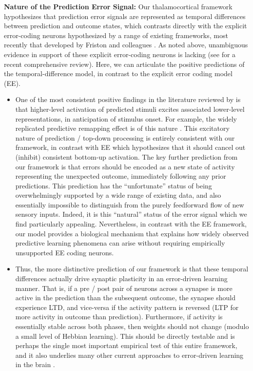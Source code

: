 \documentclass[11pt,twoside]{article}
\newif\myifpdf
\begin{document}
{\bf Nature of the Prediction Error Signal:} Our thalamocortical framework hypothesizes that prediction error signals are represented as temporal differences between prediction and outcome states, which contrasts directly with the explicit error-coding neurons hypothesized by a range of existing frameworks, most recently that developed by Friston and colleagues \cite{Friston10}.  As noted above, unambiguous evidence in support of these explicit error-coding neurons is lacking (see  for a recent comprehensive review).  Here, we can articulate the positive predictions of the temporal-difference model, in contrast to the explicit error coding model (EE).
\begin{itemize}
	\item One of the most consistent positive findings in the literature reviewed by  is that higher-level activation of predicted stimuli excites associated lower-level representations, in anticipation of stimulus onset.  For example, the widely replicated predictive remapping effect is of this nature \cite{DuhamelColbyGoldberg92,CavanaghHuntAfrazEtAl10}.  This excitatory nature of prediction / top-down processing is entirely consistent with our framework, in contrast with EE which hypothesizes that it should cancel out (inhibit) consistent bottom-up activation.  The key further prediction from our framework is that errors should be encoded as a new state of activity representing the unexpected outcome, immediately following any prior predictions.  This prediction has the ``unfortunate'' status of being overwhelmingly supported by a wide range of existing data, and also essentially impossible to distinguish from the purely feedforward flow of new sensory inputs.  Indeed, it is this ``natural'' status of the error signal which we find particularly appealing.  Nevertheless, in contrast with the EE framework, our model provides a biological mechanism that explains how widely observed predictive learning phenomena can arise without requiring empirically unsupported EE coding neurons.
	\item Thus, the more distinctive prediction of our framework is that these temporal differences actually drive synaptic plasticity in an error-driven learning manner.  That is, if a pre / post pair of neurons across a synapse is more active in the prediction than the subsequent outcome, the synapse should experience LTD, and vice-versa if the activity pattern is reversed (LTP for more activity in outcome than prediction).  Furthermore, if activity is essentially stable across both phases, then weights should not change (modulo a small level of Hebbian learning).  This should be directly testable and is perhaps the single most important empirical test of this entire framework, and it also underlies many other current approaches to error-driven learning in the brain \cite{BengioMesnardFischerEtAl17,WhittingtonBogacz19,LillicrapSantoroMarrisEtAl20}.

\end{itemize}
\end{document}
